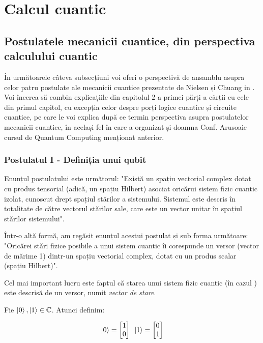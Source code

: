 \section{Calcul cuantic}

\subsection{Postulatele mecanicii cuantice, din perspectiva calculului cuantic}

În următoarele câteva subsecțiuni voi oferi o perspectivă de ansamblu asupra celor patru postulate ale mecanicii cuantice prezentate de Nielsen și Chuang in \cite{book:QCQI10E:2011}. Voi încerca să combin explicațiile din capitolul 2 a primei părți a cărții cu cele din primul capitol, cu excepția celor despre porți logice cuantice și circuite cuantice, pe care le voi explica după ce termin perspectiva asupra postulatelor mecanicii cuantice, în același fel în care a organizat și doamna Conf. Arusoaie cursul de Quantum Computing menționat anterior.

\subsubsection{\textbf{Postulatul I} - Definiția unui qubit}

Enunțul postulatului este următorul: "Există un spațiu vectorial complex dotat cu produs tensorial (adică, un spațiu Hilbert) asociat oricărui sistem fizic cuantic izolat, cunoscut drept spațiul stărilor a sistemului. Sistemul este descris în totalitate de către vectorul stărilor sale, care este un vector unitar în spațiul stărilor sistemului".

Într-o altă formă, am regăsit enunțul acestui postulat și sub forma următoare: "Oricărei stări fizice posibile a unui sistem cuantic îi corespunde un versor (vector de mărime 1) dintr-un spațiu vectorial complex, dotat cu un produs scalar (spațiu Hilbert)".

Cel mai important lucru este faptul că starea unui sistem fizic cuantic (în cazul ) este descrisă de un versor, numit \textit{vector de stare}. 

Fie $\ket{0}, \ket{1} \in \mathbb{C}$. Atunci definim:

\[
\ket{0} = \begin{bmatrix}
1 \\ 0
\end{bmatrix}
\enspace
\ket{1} = \begin{bmatrix}
0 \\ 1
\end{bmatrix}
\]

